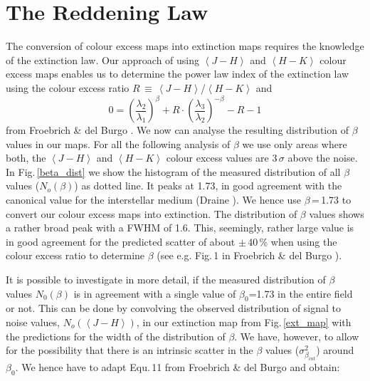 \documentclass[useAMS,usenatbib]{mn2e}
\begin{document}
\section{The Reddening Law}
\label{reddening}

The conversion of colour excess maps into extinction maps requires the knowledge
of the extinction law. Our approach of using $\left< J-H \right>$ and $\left<
H-K \right>$ colour excess maps enables us to determine the power law index of
the extinction law using the colour excess ratio $R$\,$\equiv$\,$\left< J-H
\right>$/$\left< H-K \right>$ and 
\begin{equation}
0 = \left( \frac{\lambda_2}{\lambda_1} \right)^{\beta} + R \cdot \left(
\frac{\lambda_3}{\lambda_2} \right)^{-\beta} - R - 1
\label{equ1}
\end{equation}
from Froebrich \& del Burgo \cite{2006MNRAS.369.1901F}. We now can analyse the
resulting distribution of $\beta$ values in our maps. For all the following
analysis of $\beta$ we use only areas where both, the $\left< J-H \right>$ and
$\left< H-K \right>$ colour excess values are 3\,$\sigma$ above the noise. In
Fig.\,\ref{beta_dist} we show the histogram of the measured distribution of all
$\beta$ values ($N_{o}(\beta)$) as dotted line. It peaks at 1.73, in good
agreement with the canonical value for the interstellar medium (Draine
\cite{2003ARA&A..41..241D}). We hence use $\beta$\,=\,1.73 to convert our colour
excess maps into extinction. The distribution of $\beta$ values shows a rather
broad peak with a FWHM of 1.6. This, seemingly, rather large value is in good
agreement for the predicted scatter of about $\pm$\,40\,\% when using the colour
excess ratio to determine $\beta$ (see e.g. Fig.\,1 in Froebrich \& del Burgo
\cite{2006MNRAS.369.1901F}).  

It is possible to investigate in more detail, if the measured distribution of
$\beta$ values $N_0(\beta)$ is in agreement with a single value of
$\beta_0$=1.73 in the entire field or not. This can be done by convolving the
observed distribution of signal to noise values, $N_{o}(\left< J-H \right>)$, in
our extinction map from Fig.\,\ref{ext_map} with the predictions for the width
of the distribution of $\beta$. We have, however, to allow for the possibility
that there is an intrinsic scatter in the $\beta$ values
($\sigma^2_{\beta_{int}}$) around $\beta_0$. We hence have to adapt Equ.\,11
from Froebrich \& del Burgo \cite{2006MNRAS.369.1901F} and obtain:
\end{document}
